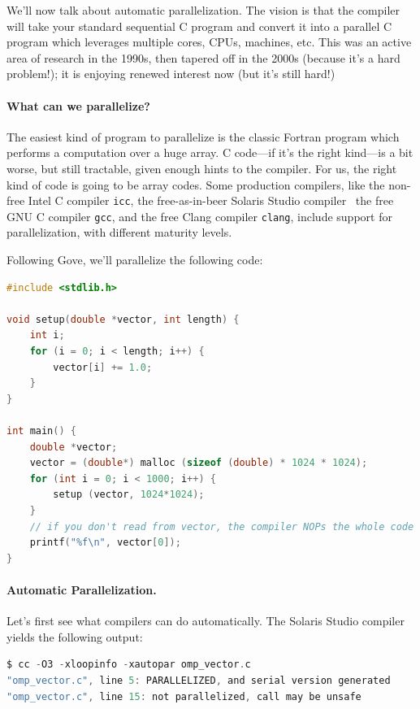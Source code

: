 \documentclass[a4paper]{report}
\begin{document}
We'll now talk about automatic parallelization. The vision is that the compiler will take
your standard sequential C program and convert it into a parallel C
program which leverages multiple cores, CPUs, machines, etc.  This was
an active area of research in the 1990s, then tapered off in the 2000s
(because it's a hard problem!); it is enjoying renewed interest now (but
it's still hard!)

\paragraph{What can we parallelize?} The
easiest kind of program to parallelize is the classic Fortran program
which performs a computation over a huge array. C code---if it's the
right kind---is a bit worse, but still tractable, given enough hints
to the compiler. For us, the right kind of code is going to be array
codes. Some production compilers, like the non-free Intel C compiler
{\tt icc}, the free-as-in-beer Solaris Studio
compiler~\cite{solarisstudio}
the free GNU C compiler {\tt gcc}, and the free Clang compiler {\tt clang}, include support for
parallelization, with different maturity levels.


Following Gove, we'll parallelize the following code:
\begin{lstlisting}[language=C]
#include <stdlib.h>

void setup(double *vector, int length) {
    int i;
    for (i = 0; i < length; i++) {
        vector[i] += 1.0;
    }
}

int main() {
    double *vector;
    vector = (double*) malloc (sizeof (double) * 1024 * 1024);
    for (int i = 0; i < 1000; i++) {
        setup (vector, 1024*1024);
    }
    // if you don't read from vector, the compiler NOPs the whole code
    printf("%f\n", vector[0]);
}
\end{lstlisting}


\paragraph{Automatic Parallelization.} Let's first see what compilers can do automatically.
The Solaris Studio compiler yields the following output:
{\small 
\begin{lstlisting}[language=C]
$ cc -O3 -xloopinfo -xautopar omp_vector.c 
"omp_vector.c", line 5: PARALLELIZED, and serial version generated
"omp_vector.c", line 15: not parallelized, call may be unsafe
\end{lstlisting}
} 
\end{document}
